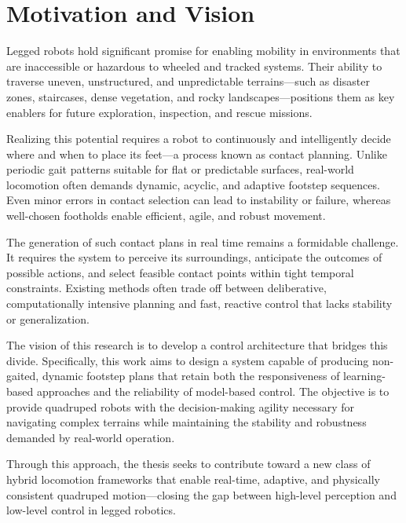 \section{Motivation and Vision}
\label{sec:introduction-motivation-and-vision}

Legged robots hold significant promise for enabling mobility in
environments that are inaccessible or hazardous to wheeled and
tracked systems. Their ability to traverse uneven, unstructured, and
unpredictable terrains—such as disaster zones, staircases, dense
vegetation, and rocky landscapes—positions them as key enablers for
future exploration, inspection, and rescue missions.

Realizing this potential requires a robot to continuously and
intelligently decide where and when to place its feet—a process known
as contact planning. Unlike periodic gait patterns suitable for flat
or predictable surfaces, real-world locomotion often demands dynamic,
acyclic, and adaptive footstep sequences. Even minor errors in
contact selection can lead to instability or failure, whereas
well-chosen footholds enable efficient, agile, and robust movement.

The generation of such contact plans in real time remains a
formidable challenge. It requires the system to perceive its
surroundings, anticipate the outcomes of possible actions, and select
feasible contact points within tight temporal constraints. Existing
methods often trade off between deliberative, computationally
intensive planning and fast, reactive control that lacks stability or
generalization.

The vision of this research is to develop a control architecture that
bridges this divide. Specifically, this work aims to design a system
capable of producing non-gaited, dynamic footstep plans that retain
both the responsiveness of learning-based approaches and the
reliability of model-based control. The objective is to provide
quadruped robots with the decision-making agility necessary for
navigating complex terrains while maintaining the stability and
robustness demanded by real-world operation.

Through this approach, the thesis seeks to contribute toward a new
class of hybrid locomotion frameworks that enable real-time,
adaptive, and physically consistent quadruped motion—closing the gap
between high-level perception and low-level control in legged robotics.
